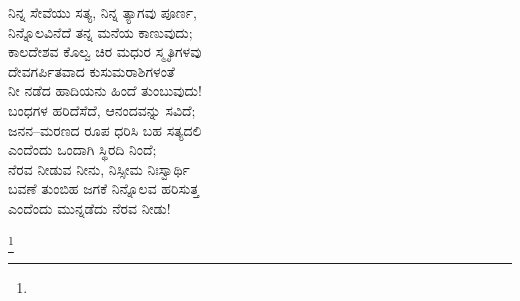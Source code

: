 \begin{myquote}
ನಿನ್ನ ಸೇವೆಯು ಸತ್ಯ, ನಿನ್ನ ತ್ಯಾಗವು ಪೂರ್ಣ,\\ನಿನ್ನೊಲವಿನೆದೆ ತನ್ನ ಮನೆಯ ಕಾಣುವುದು;\\ಕಾಲದೇಶವ ಕೊಲ್ವ ಚಿರ ಮಧುರ ಸ್ಮೃತಿಗಳವು\\ದೇವಗರ್ಪಿತವಾದ ಕುಸುಮರಾಶಿಗಳಂತೆ\\ನೀ ನಡೆದ ಹಾದಿಯನು ಹಿಂದೆ ತುಂಬುವುದು!\\ಬಂಧಗಳ ಹರಿದೆಸೆದೆ, ಆನಂದವನ್ನು ಸವಿದೆ;\\ಜನನ–ಮರಣದ ರೂಪ ಧರಿಸಿ ಬಹ ಸತ್ಯದಲಿ\\ಎಂದೆಂದು ಒಂದಾಗಿ ಸ್ಥಿರದಿ ನಿಂದೆ;\\ನೆರವ ನೀಡುವ ನೀನು, ನಿಸ್ಸೀಮ ನಿಃಸ್ವಾರ್ಥಿ\\ಬವಣೆ ತುಂಬಿಹ ಜಗಕೆ ನಿನ್ನೊಲವ ಹರಿಸುತ್ತ\\ಎಂದೆಂದು ಮುನ್ನಡೆದು ನೆರವ ನೀಡು!
\end{myquote}

\protect\footnote{}

